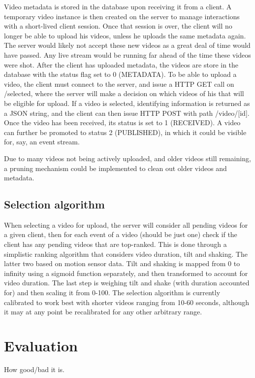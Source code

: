 \documentclass[conference]{IEEEtran}
\begin{document}
Video metadata is stored in the database upon receiving it from a client. A temporary video instance
is then created on the server to manage interactions with a short-lived client session. Once that session
is over, the client will no longer be able to upload his videos, unless he uploads the same metadata again.
The server would likely not accept these new videos as a great deal of time would have passed. Any live stream
would be running far ahead of the time these videos were shot. After the client has uploaded metadata, the
videos are store in the database with the status flag set to 0 (METADATA). To be able to upload a video,
the client must connect to the server, and issue a HTTP GET call on /selected, where the server will make
a decision on which videos of his that will be eligible for upload. If a video is selected, identifying
information is returned as a JSON string, and the client can then issue HTTP POST with path /video/[id].
Once the video has been received, its status is set to 1 (RECEIVED). A video can further be promoted to
status 2 (PUBLISHED), in which it could be visible for, say, an event stream.

Due to many videos not being actively uploaded, and older videos still remaining, a pruning mechanism could
be implemented to clean out older videos and metadata.

\subsection{Selection algorithm}

When selecting a video for upload, the server will consider all pending videos for a given client,
then for each event of a video (should be just one) check if the client has any pending videos that
are top-ranked. This is done through a simplistic ranking algorithm that considers video duration, tilt
and shaking. The latter two based on motion sensor data. Tilt and shaking is mapped from 0 to infinity
using a sigmoid function separately, and then transformed to account for video duration. The last step
is weighing tilt and shake (with duration accounted for) and then scaling it from 0-100.
The selection algorithm is currently calibrated to work best with shorter videos ranging from 10-60 seconds,
although it may at any point be recalibrated for any other arbitrary range.

\section{Evaluation}
How good/bad it is.
\end{document}
